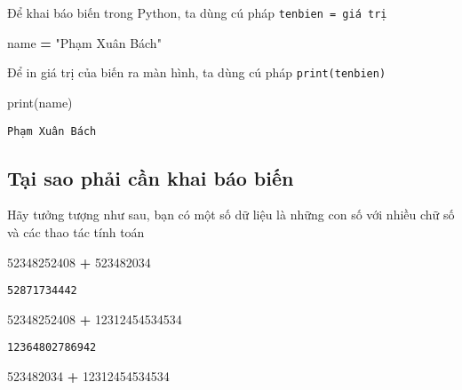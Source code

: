\documentclass[
]{book}
\newenvironment{Shaded}{\begin{snugshade}}{\end{snugshade}}
\newcommand{\BuiltInTok}[1]{#1}
\newcommand{\DecValTok}[1]{\textcolor[rgb]{0.00,0.00,0.81}{#1}}
\newcommand{\NormalTok}[1]{#1}
\newcommand{\OperatorTok}[1]{\textcolor[rgb]{0.81,0.36,0.00}{\textbf{#1}}}
\newcommand{\StringTok}[1]{\textcolor[rgb]{0.31,0.60,0.02}{#1}}
\begin{document}
Để khai báo biến trong Python, ta dùng cú pháp\hspace{0pt} \texttt{tenbien\ =\ giá\ trị}

\begin{Shaded}
\begin{Highlighting}[]
\NormalTok{name }\OperatorTok{=} \StringTok{"Phạm Xuân Bách"}
\end{Highlighting}
\end{Shaded}

Để in giá trị của biến ra màn hình, ta dùng cú pháp \texttt{print(tenbien)}

\begin{Shaded}
\begin{Highlighting}[]
\BuiltInTok{print}\NormalTok{(name)}
\end{Highlighting}
\end{Shaded}

\begin{verbatim}
Phạm Xuân Bách
\end{verbatim}

\subsection{Tại sao phải cần khai báo biến}\label{tux1ea1i-sao-phux1ea3i-cux1ea7n-khai-buxe1o-biux1ebfn}

Hãy tưởng tượng như sau, bạn có một số dữ liệu là những con số với nhiều chữ số và các thao tác tính toán

\begin{Shaded}
\begin{Highlighting}[]
\DecValTok{52348252408} \OperatorTok{+} \DecValTok{523482034}
\end{Highlighting}
\end{Shaded}

\begin{verbatim}
52871734442
\end{verbatim}

\begin{Shaded}
\begin{Highlighting}[]
\DecValTok{52348252408} \OperatorTok{+} \DecValTok{12312454534534}
\end{Highlighting}
\end{Shaded}

\begin{verbatim}
12364802786942
\end{verbatim}

\begin{Shaded}
\begin{Highlighting}[]
\DecValTok{523482034} \OperatorTok{+} \DecValTok{12312454534534}
\end{Highlighting}
\end{Shaded}
\end{document}
